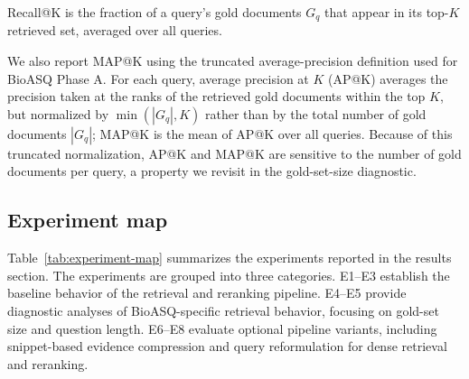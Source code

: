 \documentclass[
]{ceurart}
\begin{document}
Recall@K is the fraction of a query's gold documents $G_q$ that appear in its top-$K$ retrieved set, averaged over all queries.

We also report MAP@K using the truncated average-precision definition used for BioASQ Phase A. For each query, average precision at $K$ (AP@K) averages the precision taken at the ranks of the retrieved gold documents within the top $K$, but normalized by $\min(|G_q|, K)$ rather than by the total number of gold documents $|G_q|$; MAP@K is the mean of AP@K over all queries. Because of this truncated normalization, AP@K and MAP@K are sensitive to the number of gold documents per query, a property we revisit in the gold-set-size diagnostic.

\subsection{Experiment map}

Table~\ref{tab:experiment-map} summarizes the experiments reported in the results section. The experiments are grouped into three categories. E1--E3 establish the baseline behavior of the retrieval and reranking pipeline. E4--E5 provide diagnostic analyses of BioASQ-specific retrieval behavior, focusing on gold-set size and question length. E6--E8 evaluate optional pipeline variants, including snippet-based evidence compression and query reformulation for dense retrieval and reranking.
\end{document}
